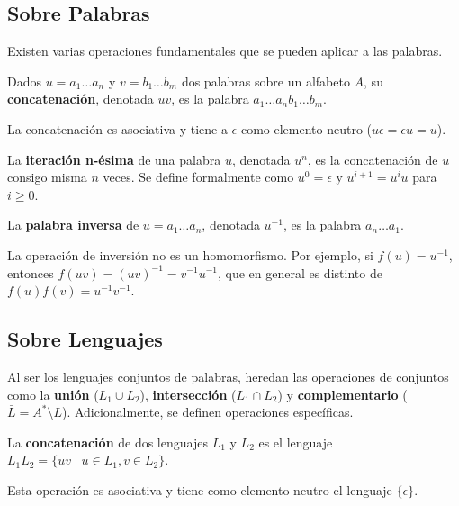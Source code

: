 \subsection{Sobre Palabras}

Existen varias operaciones fundamentales que se pueden aplicar a las palabras.

\begin{definicion}[Concatenación]
Dados $u = a_1 \dots a_n$ y $v = b_1 \dots b_m$ dos palabras sobre un alfabeto $A$, su \textbf{concatenación}, denotada $uv$, es la palabra $a_1 \dots a_n b_1 \dots b_m$.
\end{definicion}
La concatenación es asociativa y tiene a $\epsilon$ como elemento neutro ($u\epsilon = \epsilon u = u$).

\begin{definicion}[Iteración]
La \textbf{iteración n-ésima} de una palabra $u$, denotada $u^n$, es la concatenación de $u$ consigo misma $n$ veces. Se define formalmente como $u^0 = \epsilon$ y $u^{i+1} = u^i u$ para $i \geq 0$.
\end{definicion}

\begin{definicion}
La \textbf{palabra inversa} de $u = a_1 \dots a_n$, denotada $u^{-1}$, es la palabra $a_n \dots a_1$.
\end{definicion}

\begin{anotacion}
La operación de inversión no es un homomorfismo. Por ejemplo, si $f(u) = u^{-1}$, entonces $f(uv) = (uv)^{-1} = v^{-1}u^{-1}$, que en general es distinto de $f(u)f(v) = u^{-1}v^{-1}$.
\end{anotacion}

\subsection{Sobre Lenguajes}

Al ser los lenguajes conjuntos de palabras, heredan las operaciones de conjuntos como la \textbf{unión} ($L_1 \cup L_2$), \textbf{intersección} ($L_1 \cap L_2$) y \textbf{complementario} ($\bar{L} = A^* \setminus L$). Adicionalmente, se definen operaciones específicas.

\begin{definicion}
La \textbf{concatenación} de dos lenguajes $L_1$ y $L_2$ es el lenguaje $L_1 L_2 = \{uv \mid u \in L_1, v \in L_2\}$.
\end{definicion}
Esta operación es asociativa y tiene como elemento neutro el lenguaje $\{\epsilon\}$.

